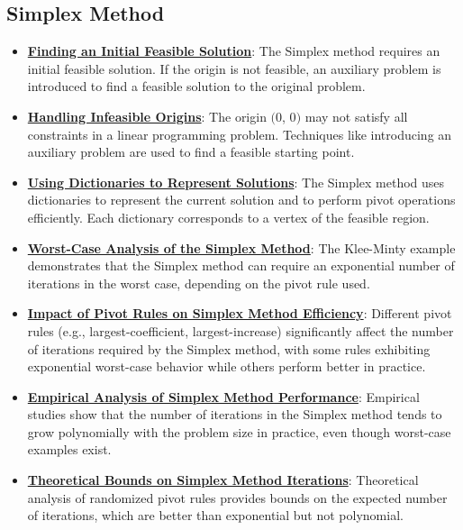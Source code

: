 \documentclass{article}%
\begin{document}
\subsection{Simplex Method}%
\label{subsec:SimplexMethod}%
\begin{itemize}[leftmargin=*]%
\item \href{https://www.math.purdue.edu/~yipn/421/2024-08-27-ExSimplex.pdf#page=32}{\textbf{Finding an Initial Feasible Solution}}: The Simplex method requires an initial feasible solution. If the origin is not feasible, an auxiliary problem is introduced to find a feasible solution to the original problem.%
\item \href{https://www.math.purdue.edu/~yipn/421/2024-08-27-ExSimplex.pdf#page=30}{\textbf{Handling Infeasible Origins}}: The origin $($0, 0$)$ may not satisfy all constraints in a linear programming problem. Techniques like introducing an auxiliary problem are used to find a feasible starting point.%
\item \href{https://www.math.purdue.edu/~yipn/421/2024-08-27-ExSimplex.pdf#page=26}{\textbf{Using Dictionaries to Represent Solutions}}: The Simplex method uses dictionaries to represent the current solution and to perform pivot operations efficiently. Each dictionary corresponds to a vertex of the feasible region.%
\item \href{https://www.math.purdue.edu/~yipn/421/2024-09-05-SimplexEfficiency.pdf#page=2}{\textbf{Worst-Case Analysis of the Simplex Method}}: The Klee-Minty example demonstrates that the Simplex method can require an exponential number of iterations in the worst case, depending on the pivot rule used.%
\item \href{https://www.math.purdue.edu/~yipn/421/2024-09-05-SimplexEfficiency.pdf#page=3}{\textbf{Impact of Pivot Rules on Simplex Method Efficiency}}: Different pivot rules (e.g., largest-coefficient, largest-increase) significantly affect the number of iterations required by the Simplex method, with some rules exhibiting exponential worst-case behavior while others perform better in practice.%
\item \href{https://www.math.purdue.edu/~yipn/421/2024-09-05-SimplexEfficiency.pdf#page=9}{\textbf{Empirical Analysis of Simplex Method Performance}}: Empirical studies show that the number of iterations in the Simplex method tends to grow polynomially with the problem size in practice, even though worst-case examples exist.%
\item \href{https://www.math.purdue.edu/~yipn/421/2024-09-05-SimplexEfficiency.pdf#page=10}{\textbf{Theoretical Bounds on Simplex Method Iterations}}: Theoretical analysis of randomized pivot rules provides bounds on the expected number of iterations, which are better than exponential but not polynomial.%

\end{itemize}
\end{document}
